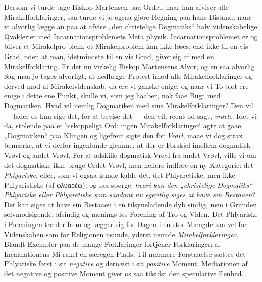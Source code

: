 \documentclass[12pt]{book}
\newcommand{\opage}[1]{\marginnote{\footnotesize\textit{[#1]}}}
\begin{document}
Dersom vi turde tage Biskop Martensen paa Ordet,
naar han afviser alle Mirakelforklaringer, saa turde vi jo
ogsaa gjøre Regning paa hans Bistand, naar vi alvorlig
lægge an paa at afvise „den christelige Dogmatiks“ halv\-%
videnskabelige Qvaklerier med Incarnationsproblemets Meta\-%
physik. Incarnationsproblemet er og bliver et Mirakelpro\-%
blem; et Mirakelproblem kan ikke løses, end ikke til en vis
Grad, uden at man, idetmindste til en vis Grad, giver sig
af med en Mirakelforklaring. Er det nu virkelig Biskop
Martensens Alvor, og en saa alvorlig Sag maa jo tages
alvorligt, at nedlægge Protest imod alle Mirakelforklaringer
og derved mod al Mirakelvidenskab: da ere vi ganske enige,
og naar vi To blot ere enige i dette ene Punkt, skulle vi,
som jeg haaber, nok faae Bugt med Dogmatiken. Hvad vil
nemlig Dogmatiken med sine Mirakelforklaringer? Den vil
--- lader os kun sige det, for at bevise det --- den vil, reent
ud sagt, \emph{vrøvle}. Idet vi da, stolende paa et biskoppeligt
Ord: ingen Mirakelforklaringer! agte at gaae „Dogmatiken“
paa Klingen og ligefrem sigte den for \emph{Vrøvl}, maae vi dog
strax bemærke, at vi derfor ingenlunde glemme, at der er
Forskjel imellem dogmatisk Vrøvl og andet Vrøvl. For at
adskille dogmatisk Vrøvl fra andet Vrøvl, ville vi om det
dogmatiske ikke bruge Ordet Vrøvl, men hellere indføre en
ny Kategorie: det \emph{Phlyariske}, eller, som vi ogsaa kunde
kalde det, det Phlyaretiske, men ikke Phlyaristiske (af
φλυαρέω); og saa spørge: \emph{hvori kan den „christelige
Dogmatiks“ Phlyariske eller Phlyaretiske som
saadant nu egentlig siges at have sin Bestaaen}?
Det kan siges at have sin Bestaaen i en tilsyneladende dyb\-%
sindig, men i Grunden selvmodsigende, afsindig og menings\-%
løs Forening af Tro og Viden. Det Phlyariske i Foreningen
\opage{91}\setcounter{footnote}{0}%
træder frem og lægger sig for Dagen i en stor Mængde saa\-%
vel for Videnskaben som for Religionen usunde, yderst usunde
\emph{Mirakelforklaringer}. Blandt Exempler paa de mange
Forklaringer fortjener Forklaringen af Incarnationens Mi\-%
rakel en særegen Plads. Til nærmere Forstaaelse sættes det
Phlyariske først i sit \emph{negative} og dernæst i sit \emph{positive}
Moment; Mediationen af det negative og positive Moment
giver os saa tilsidst den speculative Eenhed.
\end{document}
